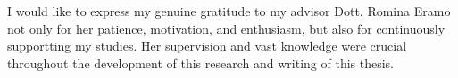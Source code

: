 \renewcommand{\sfdefault}{phv}

I would like to express my genuine gratitude to my advisor Dott. Romina Eramo not only for her patience, motivation, and enthusiasm, but also for continuously supportting my studies. Her supervision and vast knowledge were crucial throughout the development of this research and writing of this thesis. 
